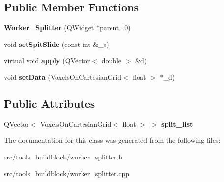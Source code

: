 \subsection*{Public Member Functions}
\begin{DoxyCompactItemize}
\item 
\mbox{\label{classWorker__Splitter_a15c799c0805dc73f2238f2f7cf1a3b7c}} 
{\bfseries Worker\+\_\+\+Splitter} (Q\+Widget $\ast$parent=0)
\item 
\mbox{\label{classWorker__Splitter_a3aeba8122c3902784eaefcb11009ba21}} 
void {\bfseries set\+Spit\+Slide} (const int \&\+\_\+s)
\item 
\mbox{\label{classWorker__Splitter_af06a8ff739af01c614867610a9a9008c}} 
virtual void {\bfseries apply} (Q\+Vector$<$ double $>$ \&d)
\item 
\mbox{\label{classWorker__Splitter_a3fbda2dcd55fe3b4b63308d2f0e36e8b}} 
void {\bfseries set\+Data} (Voxels\+On\+Cartesian\+Grid$<$ float $>$ $\ast$\+\_\+d)
\end{DoxyCompactItemize}
\subsection*{Public Attributes}
\begin{DoxyCompactItemize}
\item 
\mbox{\label{classWorker__Splitter_a34221e79228bc2702c3c31d68d885ebd}} 
Q\+Vector$<$ Voxels\+On\+Cartesian\+Grid$<$ float $>$ $>$ {\bfseries split\+\_\+list}
\end{DoxyCompactItemize}


The documentation for this class was generated from the following files\+:\begin{DoxyCompactItemize}
\item 
src/tools\+\_\+buildblock/worker\+\_\+splitter.\+h\item 
src/tools\+\_\+buildblock/worker\+\_\+splitter.\+cpp\end{DoxyCompactItemize}
